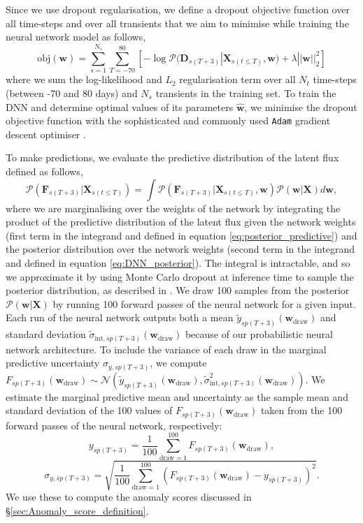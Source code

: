 \documentclass[fleqn,usenatbib]{mnras}
\begin{document}
Since we use dropout regularisation, we define a dropout objective function over all time-steps and over all transients that we aim to minimise while training the neural network model as follows,
\begin{equation}
     \mathrm{obj}(\bm{w}) = \sum\limits_{s=1}^{N_s}\sum\limits_{T=-70}^{80} 
     \left[ -\log \mathcal{P}(\bm{D}_{s(T+3)}|\bm{X}_{s(t \le T)}, \bm{w}) + \lambda ||\bm{w}||_2^2 \right]
    \label{eq:objective}
\end{equation}
where we sum the log-likelihood and $L_2$ regularisation term over all $N_t$ time-steps (between -70 and 80 days) and $N_s$ transients in the training set. To train the DNN and determine optimal values of its parameters $\bm{\hat{w}}$, we minimise the dropout objective function with the sophisticated and commonly used \texttt{Adam} gradient descent optimiser \citep{Kingma2014}. 

To make predictions, we evaluate the predictive distribution of the latent flux defined as follows,
\begin{equation}
    \mathcal{P}(\bm{F}_{s(T+3)} | \bm{X}_{s(t \le T)}) = \int \mathcal{P}(\bm{F}_{s(T+3)} | \bm{X}_{s(t \le T)}, \bm{w}) \mathcal{P}(\bm{w} |\bm{X}) d\bm{w},
    \label{eq:DNN_predicitve_distribution}
\end{equation}
where we are marginalising over the weights of the network by integrating the product of the predictive distribution of the latent flux given the network weights (first term in the integrand and defined in equation \ref{eq:posterior_predictive}) and the posterior distribution over the network weights (second term in the integrand and defined in equation \ref{eq:DNN_posterior}). The integral is intractable, and so we approximate it by using Monte Carlo dropout at inference time to sample the posterior distribution, as described in \cite{Gal2015}. We draw 100 samples from the posterior $\mathcal{P}(\bm{w} |\bm{X})$ by running 100 forward passes of the neural network for a given input. Each run of the neural network outputs both a mean $\tilde{y}_{sp(T+3)}(\bm{w}_\mathrm{draw})$ and standard deviation $\tilde{\sigma}_{\mathrm{int},sp(T+3)}(\bm{w}_\mathrm{draw})$ because of our probabilistic neural network architecture. To include the variance of each draw in the marginal predictive uncertainty $\sigma_{y,{sp(T+3)}}$, we compute $F_{sp(T+3)}(\bm{w}_\mathrm{draw}) \sim \mathcal{N} \left( \tilde{y}_{sp(T+3)}(\bm{w}_\mathrm{draw}), \tilde{\sigma}^2_{\mathrm{int},sp(T+3)}(\bm{w}_\mathrm{draw}) \right)$. We estimate the marginal predictive mean and uncertainty as the sample mean and standard deviation of the 100 values of $F_{sp(T+3)}(\bm{w}_\mathrm{draw})$ taken from the 100 forward passes of the neural network, respectively:
\begin{equation}
    y_{sp(T+3)} = \frac{1}{100} \sum_{\mathrm{draw=1}}^{100} F_{sp(T+3)}(\bm{w}_\mathrm{draw}),
\end{equation}
\begin{equation}
    \sigma_{y,{sp(T+3)}}  = \sqrt{\frac{1}{100} \sum_{\mathrm{draw=1}}^{100} \left(F_{sp(T+3)}(\bm{w}_\mathrm{draw}) - y_{sp(T+3)} \right)^2}.
\end{equation}
We use these to compute the anomaly scores discussed in \S\ref{sec:Anomaly_score_definition}.
\end{document}
